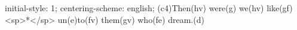 initial-style: 1;
centering-scheme: english;
(c4)Then(hv) were(g) we(hv) like(gf) <sp>*</sp> un(e)to(fv) them(gv) who(fe) dream.(d)
